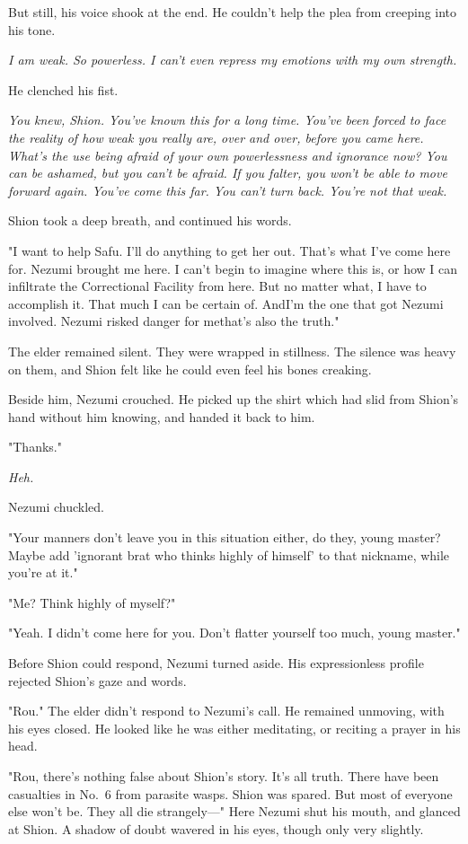 But still, his voice shook at the end. He couldn't help the plea from
creeping into his tone.

\emph{I am weak. So powerless. I can't even repress my emotions with my own
strength.}

He clenched his fist.

\emph{You knew, Shion. You've known this for a long time. You've been forced
to face the reality of how weak you really are, over and over, before
you came here. What's the use being afraid of your own powerlessness and
ignorance \emph{now}? You can be ashamed, but you can't be afraid. If you
falter, you won't be able to move forward again. You've come this far.
You can't turn back. You're not that weak.}

Shion took a deep breath, and continued his words.

"I want to help Safu. I'll do anything to get her out. That's what I've
come here for. Nezumi brought me here. I can't begin to imagine where
this is, or how I can infiltrate the Correctional Facility from here.
But no matter what, I have to accomplish it. That much I can be certain
of. And\el I'm the one that got Nezumi involved. Nezumi risked danger
for me\el that's also the truth."

The elder remained silent. They were wrapped in stillness. The silence
was heavy on them, and Shion felt like he could even feel his bones
creaking.

Beside him, Nezumi crouched. He picked up the shirt which had slid from
Shion's hand without him knowing, and handed it back to him.

"Thanks."

\emph{Heh.}

Nezumi chuckled.

"Your manners don't leave you in this situation either, do they, young
master? Maybe add 'ignorant brat who thinks highly of himself' to that
nickname, while you're at it."

"Me? Think highly of myself?"

"Yeah. I didn't come here for you. Don't flatter yourself too much,
young master."

Before Shion could respond, Nezumi turned aside. His expressionless
profile rejected Shion's gaze and words.

"Rou." The elder didn't respond to Nezumi's call. He remained unmoving,
with his eyes closed. He looked like he was either meditating, or
reciting a prayer in his head.

"Rou, there's nothing false about Shion's story. It's all truth. There
have been casualties in No.~6 from parasite wasps. Shion was spared. But
most of everyone else won't be. They all die strangely---" Here Nezumi
shut his mouth, and glanced at Shion. A shadow of doubt wavered in his
eyes, though only very slightly.

